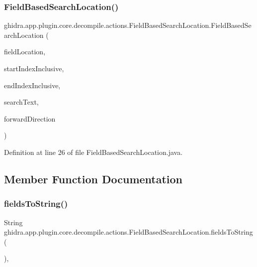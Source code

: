 \subsubsection{\texorpdfstring{FieldBasedSearchLocation()}{FieldBasedSearchLocation()}}
{\footnotesize\ttfamily ghidra.\+app.\+plugin.\+core.\+decompile.\+actions.\+Field\+Based\+Search\+Location.\+Field\+Based\+Search\+Location (\begin{DoxyParamCaption}\item[{Field\+Location}]{field\+Location,  }\item[{int}]{start\+Index\+Inclusive,  }\item[{int}]{end\+Index\+Inclusive,  }\item[{String}]{search\+Text,  }\item[{boolean}]{forward\+Direction }\end{DoxyParamCaption})\hspace{0.3cm}{\ttfamily [inline]}}



Definition at line 26 of file Field\+Based\+Search\+Location.\+java.



\subsection{Member Function Documentation}
\mbox{\label{classghidra_1_1app_1_1plugin_1_1core_1_1decompile_1_1actions_1_1_field_based_search_location_a526c8c61e62abae015cbd17d637d17f4}} 
\subsubsection{\texorpdfstring{fieldsToString()}{fieldsToString()}}
{\footnotesize\ttfamily String ghidra.\+app.\+plugin.\+core.\+decompile.\+actions.\+Field\+Based\+Search\+Location.\+fields\+To\+String (\begin{DoxyParamCaption}{ }\end{DoxyParamCaption})\hspace{0.3cm}{\ttfamily [inline]}, {\ttfamily [protected]}}



